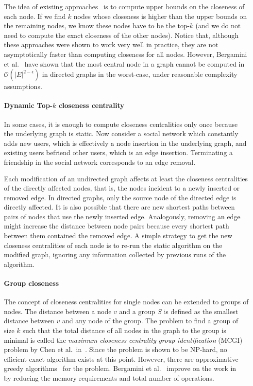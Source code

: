 The idea of existing approaches~\cite{borassi2015fast,bergamini2016computing} is to compute upper bounds on the closeness of each node. If we find $k$ nodes whose closeness is higher than the upper bounds on the remaining nodes, we know these nodes have to be the top-$k$ (and we do not need to compute the exact closeness of the other nodes). Notice that, although these approaches were shown to work very well in practice, they are not asymptotically faster than computing closeness for all nodes. However, Bergamini et al.~\cite{bergamini2016computing} have shown that the most central node in a graph cannot be computed in $\mathcal{O}(|E|^{2 - \epsilon})$ in directed graphs in the worst-case, under reasonable complexity assumptions.



\paragraph{Dynamic Top-$k$ closeness centrality}

In some cases, it is enough to compute closeness centralities only once because the underlying graph is static. Now consider a social network which constantly adds new users, which is effectively a node insertion in the underlying graph, and existing users befriend other users, which is an edge insertion. Terminating a friendship in the social network corresponds to an edge removal.

Each modification of an undirected graph affects at least the closeness centralities of the directly affected nodes, that is, the nodes incident to a newly inserted or removed edge. In directed graphs, only the source node of the directed edge is directly affected. It is also possible that there are new shortest paths between pairs of nodes that use the newly inserted edge. Analogously, removing an edge might increase the distance between node pairs because every shortest path between them contained the removed edge. A simple strategy to get the new closeness centralities of each node is to re-run the static algorithm on the modified graph, ignoring any information collected by previous runs of the algorithm.

\paragraph{Group closeness}
The concept of closeness centralities for single nodes can be extended to groups of nodes. The distance between a node $v$ and a group $S$ is defined as the smallest distance between $v$ and any node of the group. The problem to find a group of size $k$ such that the total distance of all nodes in the graph to the group is minimal is called the \emph{maximum closeness centrality group identification} (MCGI) problem by Chen et al.\ in~\cite{Chen2016}. Since the problem is shown to be NP-hard, no efficient exact algorithm exists at this point. However, there are approximative greedy algorithms~\cite{Chen2016,zhao2014measuring} for the problem. Bergamini et al.~\cite{bergaminiGroupCloseness} improve on the work in~\cite{Chen2016} by reducing the memory requirements and total number of operations.

